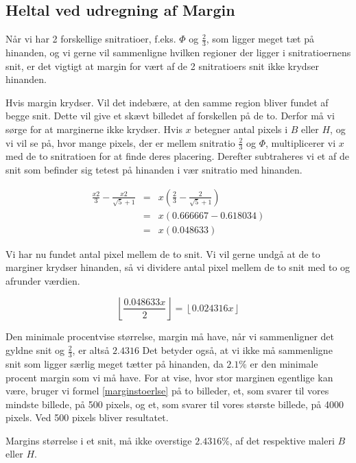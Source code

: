 \subsection{Heltal ved udregning af Margin}
Når vi har 2 forskellige snitratioer, f.eks. $\varPhi$ og $\frac{2}{3}$,
som ligger meget tæt på hinanden, og vi gerne vil sammenligne hvilken
regioner der ligger i snitratioernens snit, er det vigtigt at margin for
vært af de 2 snitratioers snit ikke krydser hinanden. 

Hvis margin krydser. Vil det indebære, at den samme region bliver fundet
af begge snit. Dette vil give et skævt billedet af forskellen på de to.
Derfor må vi sørge for at marginerne ikke krydser. Hvis $x$ betegner
antal pixels i $B$ eller $H$, og vi vil se på, hvor mange pixels, der er
mellem snitratio $\frac{2}{3}$ og $\varPhi$, multiplicerer vi $x$ med de
to snitratioen for at finde deres placering. Derefter subtraheres vi et
af de snit som befinder sig tetest på hinanden i vær snitratio med
hinanden.


\begin{eqnarray}
	\frac{x2}{3} - \frac{x2}{\sqrt{5}+1} & = & x(\frac{2}{3} - \frac{2}{\sqrt{5} + 1}) \nonumber \\
	& = & x(0.666667-0.618034) \\ \nonumber
	& = & x(0.048633)
\end{eqnarray}

Vi har nu fundet antal pixel mellem de to snit. Vi vil gerne undgå at
de to marginer krydser hinanden, så vi dividere antal pixel mellem de to snit med to og afrunder værdien.

\begin{equation}
	\left\lfloor \frac{0.048633x}{2}\right\rfloor = \left\lfloor0.024316x \right\rfloor
	\label{marginstoerlse}
\end{equation}

Den minimale procentvise størrelse, margin må have, når vi
sammenligner det gyldne snit og $\frac{2}{3}$, er altså $2.4316$ Det
betyder også, at vi ikke må sammenligne snit som ligger særlig meget
tætter på hinanden, da $2.1\%$ er den minimale procent margin som vi må
have. For at vise, hvor stor marginen egentlige kan være, bruger vi formel \ref{marginstoerlse} på to billeder, et, som svarer til vores mindste billede, på
500 pixels, og et, som svarer til vores største billede, på 4000 pixels. Ved
500 pixels bliver resultatet.

\begin{definition}
	Margins størrelse i et snit, må ikke overstige $2.4316 \%$, af det respektive maleri $B$ eller $H$.
	\label{margin_max}
\end{definition}

